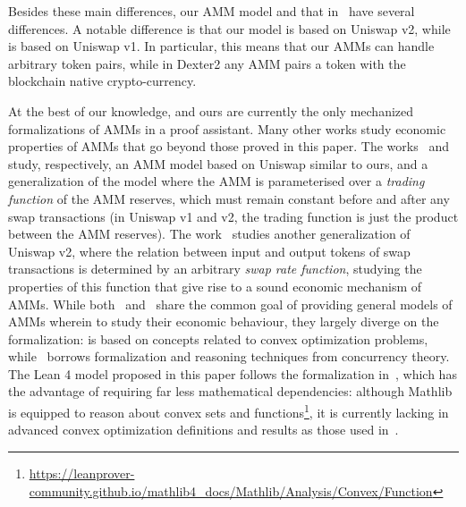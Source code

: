 Besides these main differences, our AMM model and that in~\cite{Nielsen23cpp}
have several differences.
A notable difference is that our model is based on Uniswap v2, while
\cite{Nielsen23cpp} is based on Uniswap v1.
In particular, this means that our AMMs can handle arbitrary token pairs, while 
in Dexter2 any AMM pairs a token with the blockchain native crypto-currency. 

At the best of our knowledge, \cite{Nielsen23cpp} and ours are currently 
the only mechanized formalizations of AMMs in a proof assistant.
Many other works study economic properties of AMMs that go beyond those proved in this paper. 
%
The works~\cite{Angeris21analysis} and~\cite{Angeris20aft} study, respectively, an AMM model based on Uniswap similar to ours, and a generalization of the model where the AMM is parameterised over a \emph{trading function} of the AMM reserves, which must remain constant before and after any swap transactions
(in Uniswap v1 and v2, the trading function is just the product between the AMM reserves).
%
The work~\cite{Bartoletti_2022} studies another generalization of Uniswap v2, where the relation between input and output tokens of swap transactions is determined by an arbitrary \emph{swap rate function}, studying the properties of this function that give rise to a sound economic mechanism of AMMs. 
%
While both~\cite{Angeris20aft} and~\cite{Bartoletti_2022} share the common goal
of providing general models of AMMs wherein to study their economic behaviour,
they largely diverge on the formalization:
\cite{Angeris20aft} is based on concepts related to convex optimization problems,
while~\cite{Bartoletti_2022} borrows formalization and reasoning techniques from concurrency theory.
%
The Lean 4 model proposed in this paper follows 
the formalization in~\cite{Bartoletti_2022}, which has the advantage of requiring far less mathematical dependencies: although Mathlib is equipped to reason about convex sets and functions\footnote{\url{https://leanprover-community.github.io/mathlib4_docs/Mathlib/Analysis/Convex/Function}}, it is currently lacking in advanced convex optimization definitions and results as those used in~\cite{Angeris20aft}.

